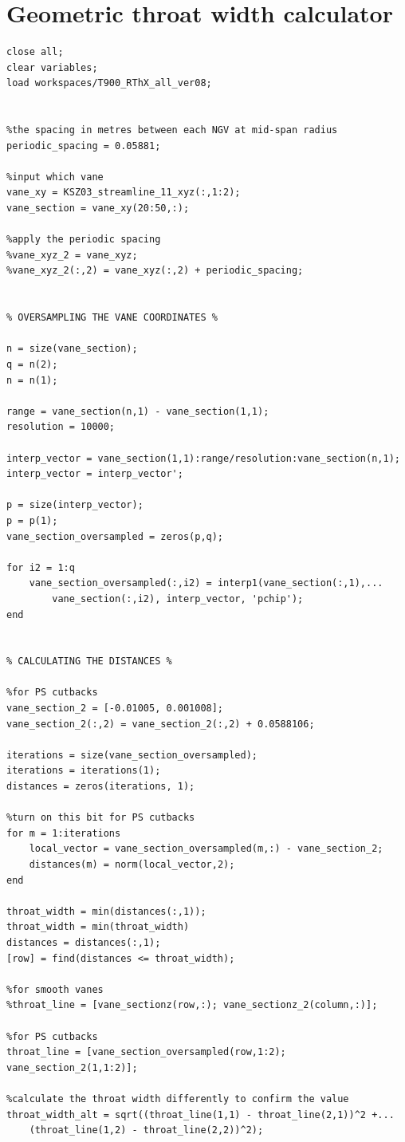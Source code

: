 \documentclass[a4paper, 11pt, oneside]{report}
\begin{document}
\section{Geometric throat width calculator} \label{code_geometric_throat_width_calculator}
\begin{verbatim}
close all;
clear variables;
load workspaces/T900_RThX_all_ver08;


%the spacing in metres between each NGV at mid-span radius
periodic_spacing = 0.05881; 

%input which vane
vane_xy = KSZ03_streamline_11_xyz(:,1:2);
vane_section = vane_xy(20:50,:);

%apply the periodic spacing
%vane_xyz_2 = vane_xyz;
%vane_xyz_2(:,2) = vane_xyz(:,2) + periodic_spacing;


% OVERSAMPLING THE VANE COORDINATES %

n = size(vane_section);
q = n(2);
n = n(1);

range = vane_section(n,1) - vane_section(1,1);
resolution = 10000;
    
interp_vector = vane_section(1,1):range/resolution:vane_section(n,1);
interp_vector = interp_vector';

p = size(interp_vector);
p = p(1);
vane_section_oversampled = zeros(p,q);

for i2 = 1:q
    vane_section_oversampled(:,i2) = interp1(vane_section(:,1),...
        vane_section(:,i2), interp_vector, 'pchip');
end 


% CALCULATING THE DISTANCES %

%for PS cutbacks
vane_section_2 = [-0.01005, 0.001008];
vane_section_2(:,2) = vane_section_2(:,2) + 0.0588106;

iterations = size(vane_section_oversampled);
iterations = iterations(1);
distances = zeros(iterations, 1);

%turn on this bit for PS cutbacks
for m = 1:iterations
    local_vector = vane_section_oversampled(m,:) - vane_section_2;
    distances(m) = norm(local_vector,2);
end

throat_width = min(distances(:,1));
throat_width = min(throat_width)
distances = distances(:,1);
[row] = find(distances <= throat_width);

%for smooth vanes
%throat_line = [vane_sectionz(row,:); vane_sectionz_2(column,:)];

%for PS cutbacks
throat_line = [vane_section_oversampled(row,1:2); vane_section_2(1,1:2)];

%calculate the throat width differently to confirm the value
throat_width_alt = sqrt((throat_line(1,1) - throat_line(2,1))^2 +...
    (throat_line(1,2) - throat_line(2,2))^2);



\end{verbatim}
\end{document}
